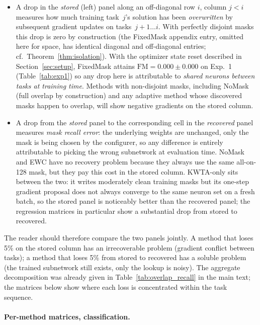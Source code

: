 \documentclass{article}
\begin{document}
\begin{itemize}
  \item A drop in the \emph{stored} (left) panel along an off-diagonal row $i$, column $j<i$ measures how much training task~$j$'s solution has been \emph{overwritten} by subsequent gradient updates on tasks~$j{+}1\ldots i$. With perfectly disjoint masks this drop is zero by construction (the FixedMask appendix entry, omitted here for space, has identical diagonal and off-diagonal entries; cf.\ Theorem~\ref{thm:isolation}). With the optimizer state reset described in Section~\ref{sec:setup}, FixedMask attains $\mathrm{FM}=0.000\pm0.000$ on Exp.\ 1 (Table~\ref{tab:exp1}) so any drop here is attributable to \emph{shared neurons between tasks at training time}. Methods with non-disjoint masks, including NoMask (full overlap by construction) and any adaptive method whose discovered masks happen to overlap, will show negative gradients on the stored column.
  \item A drop from the \emph{stored} panel to the corresponding cell in the \emph{recovered} panel measures \emph{mask recall error}: the underlying weights are unchanged, only the mask is being chosen by the configurer, so any difference is entirely attributable to picking the wrong subnetwork at evaluation time. NoMask and EWC have no recovery problem because they always use the same all-on-128 mask, but they pay this cost in the stored column. KWTA-only sits between the two: it writes moderately clean training masks but its one-step gradient proposal does not always converge to the same neuron set on a fresh batch, so the stored panel is noticeably better than the recovered panel; the regression matrices in particular show a substantial drop from stored to recovered.
\end{itemize}

The reader should therefore compare the two panels jointly. A method that loses 5\% on the stored column has an irrecoverable problem (gradient conflict between tasks); a method that loses 5\% from stored to recovered has a soluble problem (the trained subnetwork still exists, only the lookup is noisy). The aggregate decomposition was already given in Table~\ref{tab:overlap_recall} in the main text; the matrices below show where each loss is concentrated within the task sequence.

\paragraph{Per-method matrices, classification.}
\end{document}
